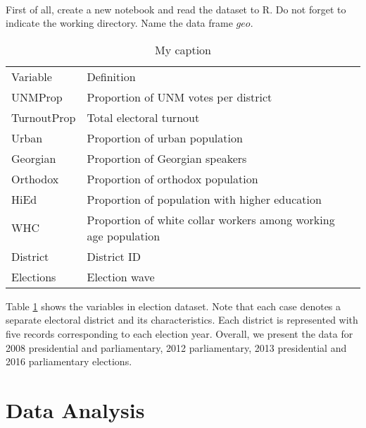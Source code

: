 \documentclass{article}\usepackage[]{graphicx}\usepackage[]{color}
\begin{document}
\paragraph{}

First of all, create a new notebook and read the dataset to R. Do not forget to indicate the working directory. Name the data frame $geo$.

\begin{table}[]
\centering
\caption{My caption}
\label{lab1}
\begin{tabular}{ll}
Variable    & Definition                                                      \\
UNMProp     & Proportion of UNM votes per district                            \\
TurnoutProp & Total electoral turnout                                         \\
Urban       & Proportion of urban population                                  \\
Georgian    & Proportion of Georgian speakers                                 \\
Orthodox    & Proportion of orthodox population                               \\
HiEd        & Proportion of population with higher education                  \\
WHC         & Proportion of white collar workers among working age population \\
District    & District ID                                                     \\
Elections   & Election wave                                                  
\end{tabular}
\end{table}

Table \ref{lab1} shows the variables in election dataset. Note that each case denotes a separate electoral district and its characteristics. Each district is represented with five records corresponding to each election year. Overall, we present the data for 2008 presidential and parliamentary, 2012 parliamentary, 2013 presidential and 2016 parliamentary elections.

\section*{Data Analysis}
\paragraph{}
\end{document}
